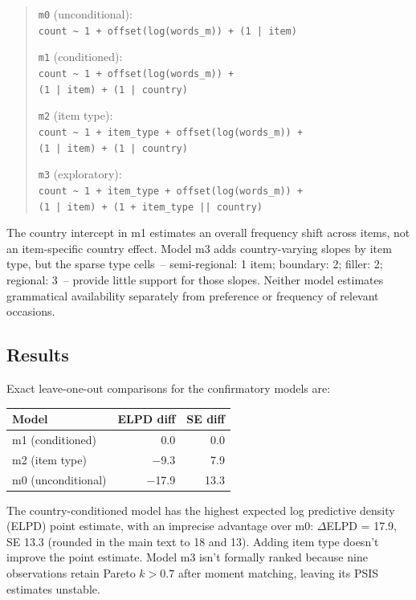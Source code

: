 \documentclass[12pt]{article}
\begin{document}
\begin{quote}
\small \noindent\texttt{m0} (unconditional):\\ \texttt{count \textasciitilde{} 1 + offset(log(words\_m)) + (1~|~item)}

\noindent\texttt{m1} (conditioned):\\ \texttt{count \textasciitilde{} 1 + offset(log(words\_m)) +}\\ \texttt{(1~|~item) + (1~|~country)}

\noindent\texttt{m2} (item type):\\ \texttt{count \textasciitilde{} 1 + item\_type + offset(log(words\_m)) +}\\ \texttt{(1~|~item) + (1~|~country)}

\noindent\texttt{m3} (exploratory):\\ \texttt{count \textasciitilde{} 1 + item\_type + offset(log(words\_m)) +}\\ \texttt{(1~|~item) + (1~+~item\_type~||~country)}
\end{quote}

The country intercept in m1 estimates an overall frequency shift across items, not an item-specific country effect. Model m3 adds country-varying slopes by item type, but the sparse type cells~-- semi-regional: 1 item; boundary: 2; filler: 2; regional: 3~-- provide little support for those slopes. Neither model estimates grammatical availability separately from preference or frequency of relevant occasions.

\subsection{Results}

Exact leave-one-out comparisons for the confirmatory models are:

\begin{center}
\begin{tabular}{lrr}
  \hline
  Model & ELPD diff & SE diff \\
  \hline
  m1 (conditioned) & 0.0 & 0.0 \\
  m2 (item type) & $-$9.3 & 7.9 \\
  m0 (unconditional) & $-$17.9 & 13.3 \\
  \hline
\end{tabular}
\end{center}

The country-conditioned model has the highest expected log predictive density (ELPD) point estimate, with an imprecise advantage over m0: $\Delta$ELPD = 17.9, SE 13.3 (rounded in the main text to 18 and 13). Adding item type doesn't improve the point estimate. Model m3 isn't formally ranked because nine observations retain Pareto $k > 0.7$ after moment matching, leaving its PSIS estimates unstable.
\end{document}
